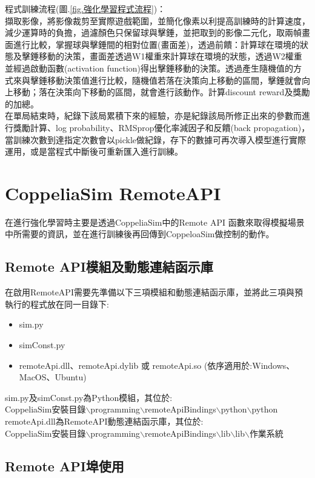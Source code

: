 \documentclass[14pt,a4paper]{report}  %
\begin{document}
程式訓練流程(圖.\ref{fig.強化學習程式流程})：\\
 擷取影像，將影像裁剪至實際遊戲範圍，並簡化像素以利提高訓練時的計算速度，減少運算時的負擔，過濾顏色只保留球與擊錘，並把取到的影像二元化，取兩幀畫面進行比較，掌握球與擊錘間的相對位置(畫面差)，透過前饋：計算球在環境的狀態及擊錘移動的決策，畫面差透過W1權重來計算球在環境的狀態，透過W2權重並經過啟動函數(activation function)得出擊錘移動的決策。透過產生隨機值的方式來與擊錘移動決策值進行比較，隨機值若落在決策向上移動的區間，擊錘就會向上移動；落在決策向下移動的區間，就會進行該動作。計算discount reward及獎勵的加總。\\

 在單局結束時，紀錄下該局累積下來的經驗，亦是紀錄該局所修正出來的參數而進行獎勵計算、log probability、RMSprop優化率減因子和反饋(back propagation)，當訓練次數到達指定次數會以pickle做紀錄，存下的數據可再次導入模型進行實際運用，或是當程式中斷後可重新匯入進行訓練。\\
\section{CoppeliaSim RemoteAPI}
在進行強化學習時主要是透過CoppeliaSim中的Remote API 函數來取得模擬場景中所需要的資訊，並在進行訓練後再回傳到CoppeloaSim做控制的動作。\\
\subsection{Remote API模組及動態連結函示庫}
在啟用RemoteAPI需要先準備以下三項模組和動態連結函示庫，並將此三項與預執行的程式放在同一目錄下:
\begin{itemize}
\item sim.py
\item simConst.py
\item remoteApi.dll、remoteApi.dylib 或 remoteApi.so (依序適用於:Windows、MacOS、Ubuntu)
\end{itemize}
sim.py及simConst.py為Python模組，其位於:\\
CoppeliaSim安裝目錄$\backslash$programming$\backslash$remoteApiBindings$\backslash$python$\backslash$python\\
remoteApi.dll為RemoteAPI動態連結函示庫，其位於:\\
CoppeliaSim安裝目錄$\backslash$programming$\backslash$remoteApiBindings$\backslash$lib$\backslash$lib$\backslash$作業系統\\
\subsection{Remote API埠使用}
\newpage
\end{document}
